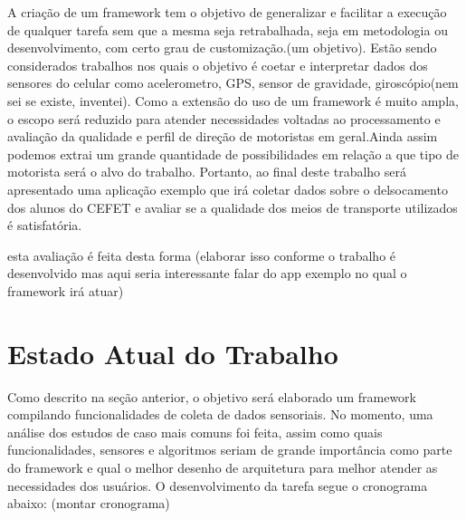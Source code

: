 \documentclass[12pt]{report} %
\begin{document}
A criação de um framework tem o objetivo de generalizar e facilitar a execução de qualquer tarefa sem que a mesma seja retrabalhada, seja em metodologia ou desenvolvimento, com certo grau de customização.(um objetivo). Estão sendo considerados trabalhos nos quais o objetivo é coetar e interpretar dados dos sensores do celular como acelerometro, GPS, sensor de gravidade, giroscópio(nem sei se existe, inventei). Como a extensão do uso de um framework é muito ampla, o escopo será reduzido para atender necessidades voltadas ao processamento e avaliação da qualidade e perfil de direção de motoristas em geral.Ainda assim podemos extrai um grande quantidade de possibilidades em relação a que tipo de motorista será o alvo do trabalho. Portanto, ao final deste trabalho será apresentado uma aplicação exemplo que irá coletar dados sobre o delsocamento dos alunos do CEFET e avaliar se a qualidade dos meios de transporte utilizados é satisfatória. 

esta avaliação é feita desta forma (elaborar isso conforme o trabalho é desenvolvido mas aqui seria interessante falar do app exemplo no qual o framework irá atuar)

\chapter{Estado Atual do Trabalho}
\label{sec:estado_atual}

Como descrito na seção anterior, o objetivo será elaborado um framework compilando funcionalidades de coleta de dados sensoriais. No momento, uma análise dos estudos de caso mais comuns foi feita, assim como quais funcionalidades, sensores e algoritmos seriam de grande importância como parte do framework e qual o melhor desenho de arquitetura para melhor atender as necessidades dos usuários. O desenvolvimento da tarefa segue o cronograma abaixo: (montar cronograma)
\end{document}
